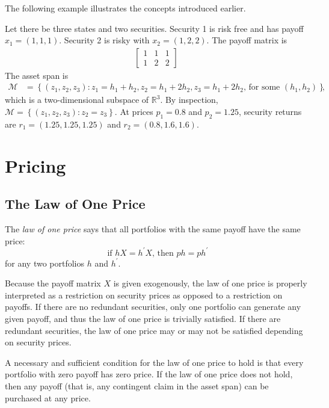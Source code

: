 \documentclass[\topdir/lecture\_notes.tex]{subfiles}
\begin{document}
The following example illustrates the concepts introduced earlier.
\begin{example} \label{ex:payoff_matrix_example}
Let there be three states and two securities. Security 1 is risk free and has payoff \(x_{1}=(1,1,1)\). Security 2 is risky with \(x_{2}=(1,2,2)\). The payoff matrix is
\begin{align*}
\left[\begin{array}{lll}
1 & 1 & 1 \\
1 & 2 & 2
\end{array}\right]
\end{align*}
The asset span is
\begin{align*}
\mathcal{M}&=\left\{(z_{1}, z_{2}, z_{3}): z_{1}=h_{1}+h_{2}, z_{2}=h_{1}+2 h_{2}, z_{3}=h_{1}+2 h_{2}\text{, for some }(h_{1}, h_{2})\right\},
\end{align*}
which is a two-dimensional subspace of \(\mathbb{R}^{3}\). By inspection, \(\mathcal{M}=\left\{\left(z_{1}, z_{2}, z_{3}\right): z_{2}=z_{3}\right\}\). At prices \(p_{1}=0.8\) and \(p_{2}=1.25\), security returns are \(r_{1}=(1.25,1.25,1.25)\) and \(r_{2}=(0.8,1.6,1.6)\).
\end{example}

\section{Pricing}
\subsection{The Law of One Price}
The \emph{law of one price} says that all portfolios with the same payoff have the same price:
\begin{equation*}
\text { if } h X=h^{\prime} X \text {, then } p h=p h^{\prime}
\end{equation*}
for any two portfolios \(h\) and \(h^{\prime}\).

Because the payoff matrix \(X\) is given exogenously, the law of one price is properly interpreted as a restriction on security prices as opposed to a restriction on payoffs. If there are no redundant securities, only one portfolio can generate any given payoff, and thus the law of one price is trivially satisfied. If there are redundant securities, the law of one price may or may not be satisfied depending on security prices.

A necessary and sufficient condition for the law of one price to hold is that every portfolio with zero payoff has zero price. If the law of one price does not hold, then any payoff (that is, any contingent claim in the asset span) can be purchased at any price.
\end{document}
